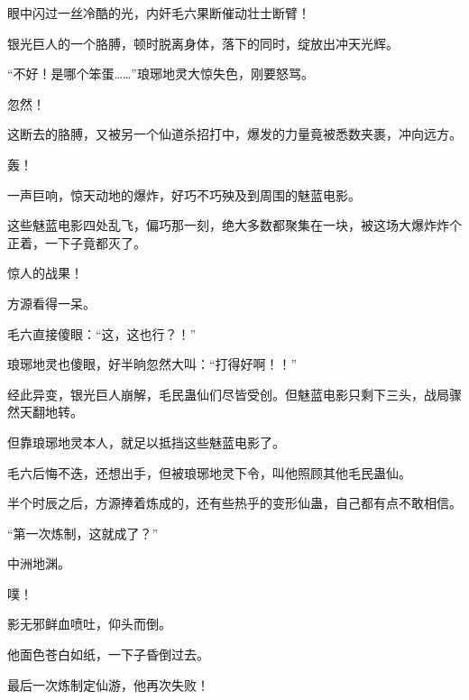 \begin{this_body}
眼中闪过一丝冷酷的光，内奸毛六果断催动壮士断臂！

银光巨人的一个胳膊，顿时脱离身体，落下的同时，绽放出冲天光辉。

“不好！是哪个笨蛋……”琅琊地灵大惊失色，刚要怒骂。

忽然！

这断去的胳膊，又被另一个仙道杀招打中，爆发的力量竟被悉数夹裹，冲向远方。

轰！

一声巨响，惊天动地的爆炸，好巧不巧殃及到周围的魅蓝电影。

这些魅蓝电影四处乱飞，偏巧那一刻，绝大多数都聚集在一块，被这场大爆炸炸个正着，一下子竟都灭了。

惊人的战果！

方源看得一呆。

毛六直接傻眼：“这，这也行？！”

琅琊地灵也傻眼，好半晌忽然大叫：“打得好啊！！”

经此异变，银光巨人崩解，毛民蛊仙们尽皆受创。但魅蓝电影只剩下三头，战局骤然天翻地转。

但靠琅琊地灵本人，就足以抵挡这些魅蓝电影了。

毛六后悔不迭，还想出手，但被琅琊地灵下令，叫他照顾其他毛民蛊仙。

半个时辰之后，方源捧着炼成的，还有些热乎的变形仙蛊，自己都有点不敢相信。

“第一次炼制，这就成了？”

中洲地渊。

噗！

影无邪鲜血喷吐，仰头而倒。

他面色苍白如纸，一下子昏倒过去。

最后一次炼制定仙游，他再次失败！

\end{this_body}

